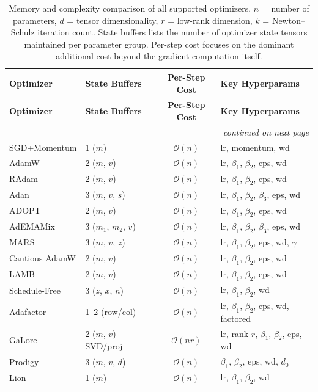 \begin{longtable}{llcl}
\toprule
\textbf{Optimizer} & \textbf{State Buffers} & \textbf{Per-Step Cost} & \textbf{Key Hyperparams} \\
\midrule
\endfirsthead
\toprule
\textbf{Optimizer} & \textbf{State Buffers} & \textbf{Per-Step Cost} & \textbf{Key Hyperparams} \\
\midrule
\endhead
\midrule
\multicolumn{4}{r}{\textit{continued on next page}} \\
\endfoot
\bottomrule
\caption{Memory and complexity comparison of all supported optimizers. $n$ = number of parameters, $d$ = tensor dimensionality, $r$ = low-rank dimension, $k$ = Newton--Schulz iteration count. State buffers lists the number of optimizer state tensors maintained per parameter group. Per-step cost focuses on the dominant additional cost beyond the gradient computation itself.}
\label{tab:optimizer-complexity}
\endlastfoot
SGD+Momentum & 1 ($m$) & $\mathcal{O}(n)$ & lr, momentum, wd \\
AdamW & 2 ($m$, $v$) & $\mathcal{O}(n)$ & lr, $\beta_1$, $\beta_2$, eps, wd \\
RAdam & 2 ($m$, $v$) & $\mathcal{O}(n)$ & lr, $\beta_1$, $\beta_2$, eps, wd \\
Adan & 3 ($m$, $v$, $s$) & $\mathcal{O}(n)$ & lr, $\beta_1$, $\beta_2$, $\beta_3$, eps, wd \\
ADOPT & 2 ($m$, $v$) & $\mathcal{O}(n)$ & lr, $\beta_1$, $\beta_2$, eps, wd \\
AdEMAMix & 3 ($m_1$, $m_2$, $v$) & $\mathcal{O}(n)$ & lr, $\beta_1$, $\beta_2$, $\beta_3$, eps, wd \\
MARS & 3 ($m$, $v$, $z$) & $\mathcal{O}(n)$ & lr, $\beta_1$, $\beta_2$, eps, wd, $\gamma$ \\
Cautious AdamW & 2 ($m$, $v$) & $\mathcal{O}(n)$ & lr, $\beta_1$, $\beta_2$, eps, wd \\
LAMB & 2 ($m$, $v$) & $\mathcal{O}(n)$ & lr, $\beta_1$, $\beta_2$, eps, wd \\
Schedule-Free & 3 ($z$, $x$, $n$) & $\mathcal{O}(n)$ & lr, $\beta_1$, $\beta_2$, wd \\
Adafactor & 1--2 (row/col) & $\mathcal{O}(n)$ & lr, $\beta_1$, $\beta_2$, eps, wd, factored \\
GaLore & 2 ($m$, $v$) + SVD/proj & $\mathcal{O}(nr)$ & lr, rank $r$, $\beta_1$, $\beta_2$, eps, wd \\
Prodigy & 3 ($m$, $v$, $d$) & $\mathcal{O}(n)$ & $\beta_1$, $\beta_2$, eps, wd, $d_0$ \\
Lion & 1 ($m$) & $\mathcal{O}(n)$ & lr, $\beta_1$, $\beta_2$, wd \\

\end{longtable}
